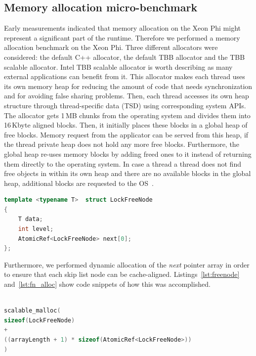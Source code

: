 \subsection{Memory allocation micro-benchmark}
Early measurements indicated that memory allocation on the Xeon Phi might represent a significant part of the runtime. Therefore we performed a memory allocation benchmark on the Xeon Phi. Three different allocators were considered: the default C++ allocator, the default TBB allocator and the TBB scalable allocator. 
Intel TBB scalable allocator is worth describing as many external applications can benefit from it. This allocator makes each thread uses its own memory heap for reducing the amount of code that needs synchronization and for avoiding false sharing problems. Then, each thread accesses its own heap structure through thread-specific data (TSD) using corresponding system APIs. The allocator gets 1\,MB chunks from the operating system and divides them into 16\,Kbyte aligned blocks. Then, it initially places these blocks in a global heap of free blocks. Memory request from the applicator can be served from this heap, if the thread private heap does not hold any more free blocks. Furthermore, the global heap re-uses memory blocks by adding freed ones to it instead of returning them directly to the operating system. In case a thread a thread does not find free objects in within its own heap and there are no available blocks in the global heap, additional blocks are requested to the OS~\cite{_thefoundations,Hudson:2006:MST:1133956.1133967}. %


\begin{lstlisting}[language=C++,basicstyle=\tt\scriptsize,captionpos=b,caption=Lock free node structure,label=lst:freenode,morekeywords={*, size_t}]
template <typename T>  struct LockFreeNode
{	
	T data;
	int	level;
	AtomicRef<LockFreeNode>	next[0];
};
\end{lstlisting}

Furthermore, we performed dynamic allocation of the {\em next} pointer array in order to ensure that each skip list node can be cache-aligned. Listings~\ref{lst:freenode} and~\ref{lst:fn_alloc} show code snippets of how this was accomplished.
\begin{lstlisting}[language=C++,basicstyle=\tt\scriptsize,captionpos=b,caption=Memory allocation instruction for array of atomic references,label=lst:fn_alloc, morekeywords={*, size_t}]

scalable_malloc(
sizeof(LockFreeNode) 
+ 
((arrayLength + 1) * sizeof(AtomicRef<LockFreeNode>))
)
\end{lstlisting}


